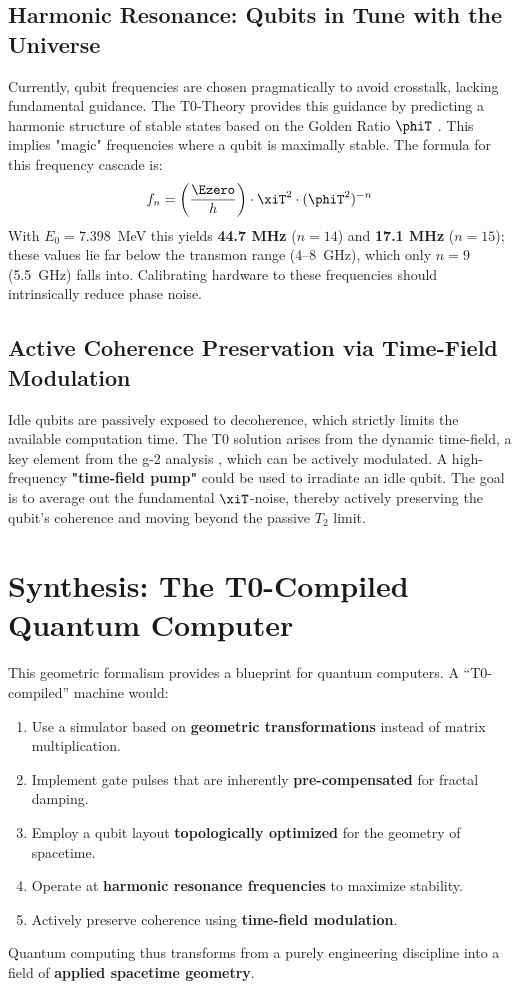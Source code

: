 	\subsection{Harmonic Resonance: Qubits in Tune with the Universe}
	Currently, qubit frequencies are chosen pragmatically to avoid crosstalk, lacking fundamental guidance. The T0-Theory provides this guidance by predicting a harmonic structure of stable states based on the Golden Ratio $\phiT$ \cite{pascher:ml_addendum}. This implies "magic" frequencies where a qubit is maximally stable. The formula for this frequency cascade is:
	\begin{equation}
		f_n = \left( \frac{\Ezero}{h} \right) \cdot \xiT^2 \cdot (\phiT^2)^{-n}
	\end{equation}
	With $E_0 = 7.398$~MeV this yields \textbf{44.7 MHz} ($n=14$) and \textbf{17.1 MHz} ($n=15$); these values lie far below the transmon range (4--8~GHz), which only $n = 9$ (5.5~GHz) falls into. Calibrating hardware to these frequencies should intrinsically reduce phase noise.
	
	\subsection{Active Coherence Preservation via Time-Field Modulation}
	Idle qubits are passively exposed to decoherence, which strictly limits the available computation time. The T0 solution arises from the dynamic time-field, a key element from the g-2 analysis \cite{pascher:g2_rev9}, which can be actively modulated. A high-frequency \textbf{"time-field pump"} could be used to irradiate an idle qubit. The goal is to average out the fundamental $\xiT$-noise, thereby actively preserving the qubit's coherence and moving beyond the passive $T_2$ limit.
	
	\section{Synthesis: The T0-Compiled Quantum Computer}
	
	This geometric formalism provides a blueprint for quantum computers. A ``T0-compiled'' machine would:
	\begin{enumerate}
		\item Use a simulator based on \textbf{geometric transformations} instead of matrix multiplication.
		\item Implement gate pulses that are inherently \textbf{pre-compensated} for fractal damping.
		\item Employ a qubit layout \textbf{topologically optimized} for the geometry of spacetime.
		\item Operate at \textbf{harmonic resonance frequencies} to maximize stability.
		\item Actively preserve coherence using \textbf{time-field modulation}.
	\end{enumerate}
	Quantum computing thus transforms from a purely engineering discipline into a field of \textbf{applied spacetime geometry}.
	
